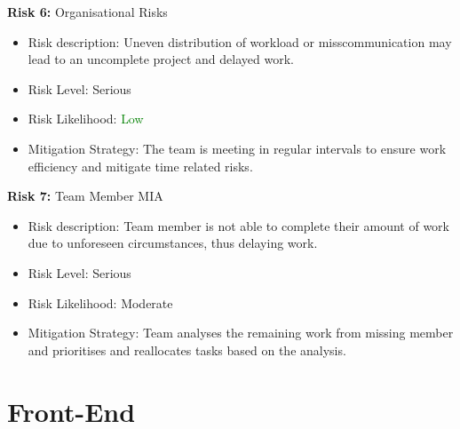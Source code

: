 \documentclass{article}
\begin{document}
\textbf{Risk 6:} Organisational Risks
\begin{itemize}
    \item Risk description: Uneven distribution of workload or misscommunication may lead to an uncomplete project and delayed work. 
    \item Risk Level: \textcolor{BurntOrange}{Serious}
    \item Risk Likelihood: \textcolor{Green}{Low}
    \item Mitigation Strategy: The team is meeting in regular intervals to ensure work efficiency and mitigate time related risks.
\end{itemize}

\textbf{Risk 7:} Team Member MIA
\begin{itemize}
    \item Risk description: Team member is not able to complete their amount of work due to unforeseen circumstances, thus delaying work. 
    \item Risk Level: \textcolor{BurntOrange}{Serious}
    \item Risk Likelihood: \textcolor{BurntOrange}{Moderate}
    \item Mitigation Strategy: Team analyses the remaining work from missing member and prioritises and reallocates tasks based on the analysis. 
\end{itemize}

\section{Front-End}
\end{document}
